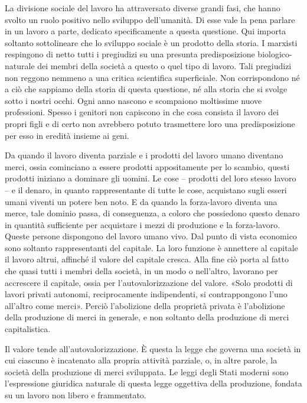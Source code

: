 \documentclass[12pt,a4paper,openany]{book}
\begin{document}
La divisione sociale del lavoro ha attraversato diverse grandi fasi, che hanno svolto un ruolo positivo nello sviluppo dell'umanità. Di esse vale la pena parlare in un lavoro a parte, dedicato specificamente a questa questione. Qui importa soltanto sottolineare che lo sviluppo sociale è un prodotto della storia. I marxisti respingono di netto tutti i pregiudizi su una presunta predisposizione biologico-naturale dei membri della società a questo o quel tipo di lavoro. Tali pregiudizi non reggono nemmeno a una critica scientifica superficiale. Non corrispondono né a ciò che sappiamo della storia di questa questione, né alla storia che si svolge sotto i nostri occhi. Ogni anno nascono e scompaiono moltissime nuove professioni. Spesso i genitori non capiscono in che cosa consista il lavoro dei propri figli e di certo non avrebbero potuto trasmettere loro una predisposizione per esso in eredità insieme ai geni.

Da quando il lavoro diventa parziale e i prodotti del lavoro umano diventano merci, ossia cominciano a essere prodotti appositamente per lo scambio, questi prodotti iniziano a dominare gli uomini. Le cose – prodotti del loro stesso lavoro – e il denaro, in quanto rappresentante di tutte le cose, acquistano sugli esseri umani viventi un potere ben noto. E da quando la forza-lavoro diventa una merce, tale dominio passa, di conseguenza, a coloro che possiedono questo denaro in quantità sufficiente per acquistare i mezzi di produzione e la forza-lavoro. Queste persone dispongono del lavoro umano vivo. Dal punto di vista economico sono soltanto rappresentanti del capitale. La loro funzione è annettere al capitale il lavoro altrui, affinché il valore del capitale cresca. Alla fine ciò porta al fatto che quasi tutti i membri della società, in un modo o nell'altro, lavorano per accrescere il capitale, ossia per l'autovalorizzazione del valore. «Solo prodotti di lavori privati autonomi, reciprocamente indipendenti, si contrappongono l'uno all'altro come merci». Perciò l'abolizione della proprietà privata è l'abolizione della produzione di merci in generale, e non soltanto della produzione di merci capitalistica.

Il valore tende all'autovalorizzazione. È questa la legge che governa una società in cui ciascuno è incatenato alla propria attività parziale, o, in altre parole, la società della produzione di merci sviluppata. Le leggi degli Stati moderni sono l'espressione giuridica naturale di questa legge oggettiva della produzione, fondata su un lavoro non libero e frammentato.
\end{document}
